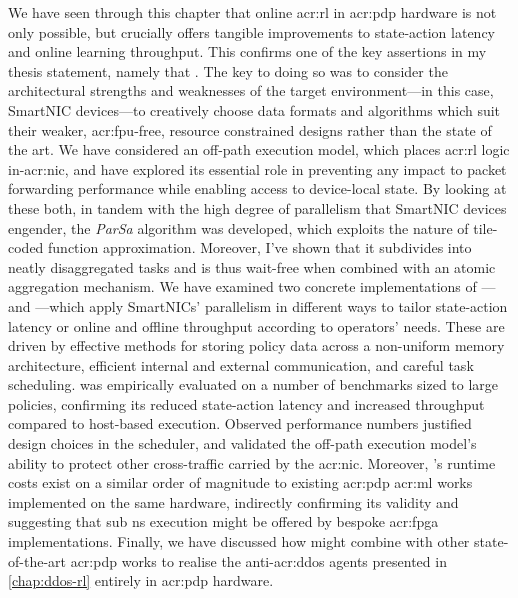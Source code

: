 We have seen through this chapter that online \gls{acr:rl} in \gls{acr:pdp} hardware is not only possible, but crucially offers tangible improvements to state-action latency and online learning throughput.
This confirms one of the key assertions in my thesis statement, namely that .
The key to doing so was to consider the architectural strengths and weaknesses of the target environment---in this case, SmartNIC devices---to creatively choose data formats and algorithms which suit their weaker, \gls{acr:fpu}-free, resource constrained designs rather than the state of the art.
We have considered an off-path execution model, which places \gls{acr:rl} logic in-\gls{acr:nic}, and have explored its essential role in preventing any impact to packet forwarding performance while enabling access to device-local state.
By looking at these both, in tandem with the high degree of parallelism that SmartNIC devices engender, the \emph{ParSa} algorithm was developed, which exploits the nature of tile-coded function approximation.
Moreover, I've shown that it subdivides into neatly disaggregated tasks and is thus wait-free when combined with an atomic aggregation mechanism.
We have examined two concrete implementations of \approachshort{}---\indfw{} and \coopfw---which apply SmartNICs' parallelism in different ways to tailor state-action latency or online and offline throughput according to operators' needs.
These are driven by effective methods for storing policy data across a non-uniform memory architecture, efficient internal and external communication, and careful task scheduling.
\approachshort{} was empirically evaluated on a number of benchmarks sized to large policies, confirming its reduced state-action latency and increased throughput compared to host-based execution.
Observed performance numbers justified design choices in the scheduler, and validated the off-path execution model's ability to protect other cross-traffic carried by the \gls{acr:nic}.
Moreover, \approachshort{}'s runtime costs exist on a similar order of magnitude to existing \gls{acr:pdp} \gls{acr:ml} works implemented on the same hardware, indirectly confirming its validity and suggesting that sub \unit{\nano\second} execution might be offered by bespoke \gls{acr:fpga} implementations.
Finally, we have discussed how \approachshort{} might combine with other state-of-the-art \gls{acr:pdp} works to realise the anti-\gls{acr:ddos} agents presented in \cref{chap:ddos-rl} entirely in \gls{acr:pdp} hardware.

